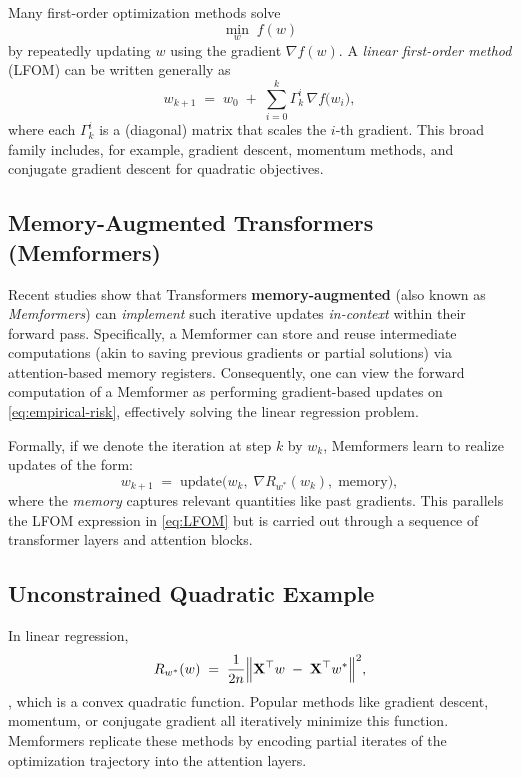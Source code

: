 Many first-order optimization methods solve
\[
  \min_{w}\; f(w)
\]
by repeatedly updating $w$ using the gradient $\nabla f(w)$. A \emph{linear first-order method} (LFOM) 
can be written generally as
\begin{equation}
  \label{eq:LFOM}
  w_{k+1} \;=\; w_0 \;+\; \sum_{i=0}^{k}\Gamma_k^i\,\nabla f\bigl(w_i\bigr),
\end{equation}
where each $\Gamma_k^i$ is a (diagonal) matrix that scales the $i$-th gradient. This broad family includes, for example, gradient descent, momentum methods, and conjugate gradient descent for quadratic objectives.

\subsection{Memory-Augmented Transformers (Memformers)}

Recent studies show that Transformers \textbf{ memory-augmented} (also known as \emph{Memformers}) can \emph{implement} such iterative updates \emph{in-context} within their forward pass. Specifically, a Memformer can store and reuse intermediate computations (akin to saving previous gradients or partial solutions) via attention-based memory registers. Consequently, one can view the forward computation of a Memformer as performing gradient-based updates on \eqref{eq:empirical-risk}, effectively solving the linear regression problem. 

Formally, if we denote the iteration at step $k$ by $w_k$, Memformers learn to realize updates of the form:
\[
  w_{k+1} \;=\; \text{update}\bigl(w_k,\;\nabla R_{w^*}(w_k),\;\text{memory}\bigr),
\]
where the \emph{memory} captures relevant quantities like past gradients. This parallels the LFOM expression in \eqref{eq:LFOM} but is carried out through a sequence of transformer layers and attention blocks.

\subsection{Unconstrained Quadratic Example}

In linear regression,
\[   R_{w^*}(w) \;=\; \frac{1}{2n}   \Bigl\|\mathbf{X}^\top w \;-\; \mathbf{X}^\top w^*\Bigr\|^2, \],
which is a convex quadratic function. Popular methods like gradient descent, momentum, or conjugate gradient all iteratively minimize this function. 
Memformers replicate these methods by encoding partial iterates of the optimization trajectory into the attention layers.


